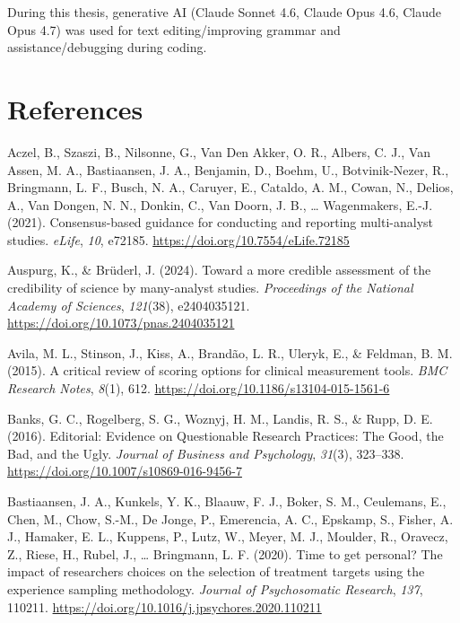 \documentclass[
  man,
  floatsintext,
  longtable,
  nolmodern,
  notxfonts,
  notimes,
  colorlinks=true,linkcolor=blue,citecolor=blue,urlcolor=blue]{apa7}
\newlength{\cslhangindent}
\newenvironment{CSLReferences}[2] %
 {\begin{list}{}{%
  \setlength{\itemindent}{0pt}
  \setlength{\leftmargin}{0pt}
  \setlength{\parsep}{0pt}
  \ifodd #1
   \setlength{\leftmargin}{\cslhangindent}
   \setlength{\itemindent}{-1\cslhangindent}
  \fi
  \setlength{\itemsep}{#2\baselineskip}}}
 {\end{list}}
\begin{document}
During this thesis, generative AI (Claude Sonnet 4.6, Claude Opus 4.6,
Claude Opus 4.7) was used for text editing/improving grammar and
assistance/debugging during coding.

\newpage

\section{References}\label{references}

\label{refs}
\begin{CSLReferences}{1}{0}
Aczel, B., Szaszi, B., Nilsonne, G., Van Den Akker, O. R., Albers, C.
J., Van Assen, M. A., Bastiaansen, J. A., Benjamin, D., Boehm, U.,
Botvinik-Nezer, R., Bringmann, L. F., Busch, N. A., Caruyer, E.,
Cataldo, A. M., Cowan, N., Delios, A., Van Dongen, N. N., Donkin, C.,
Van Doorn, J. B., \ldots{} Wagenmakers, E.-J. (2021). Consensus-based
guidance for conducting and reporting multi-analyst studies.
\emph{eLife}, \emph{10}, e72185.
\url{https://doi.org/10.7554/eLife.72185}

Auspurg, K., \& Brüderl, J. (2024). Toward a more credible assessment of
the credibility of science by many-analyst studies. \emph{Proceedings of
the National Academy of Sciences}, \emph{121}(38), e2404035121.
\url{https://doi.org/10.1073/pnas.2404035121}

Avila, M. L., Stinson, J., Kiss, A., Brandão, L. R., Uleryk, E., \&
Feldman, B. M. (2015). A critical review of scoring options for clinical
measurement tools. \emph{BMC Research Notes}, \emph{8}(1), 612.
\url{https://doi.org/10.1186/s13104-015-1561-6}

Banks, G. C., Rogelberg, S. G., Woznyj, H. M., Landis, R. S., \& Rupp,
D. E. (2016). Editorial: {Evidence} on {Questionable} {Research}
{Practices}: {The} {Good}, the {Bad}, and the {Ugly}. \emph{Journal of
Business and Psychology}, \emph{31}(3), 323--338.
\url{https://doi.org/10.1007/s10869-016-9456-7}

Bastiaansen, J. A., Kunkels, Y. K., Blaauw, F. J., Boker, S. M.,
Ceulemans, E., Chen, M., Chow, S.-M., De Jonge, P., Emerencia, A. C.,
Epskamp, S., Fisher, A. J., Hamaker, E. L., Kuppens, P., Lutz, W.,
Meyer, M. J., Moulder, R., Oravecz, Z., Riese, H., Rubel, J., \ldots{}
Bringmann, L. F. (2020). Time to get personal? {The} impact of
researchers choices on the selection of treatment targets using the
experience sampling methodology. \emph{Journal of Psychosomatic
Research}, \emph{137}, 110211.
\url{https://doi.org/10.1016/j.jpsychores.2020.110211}


\end{CSLReferences}
\end{document}

